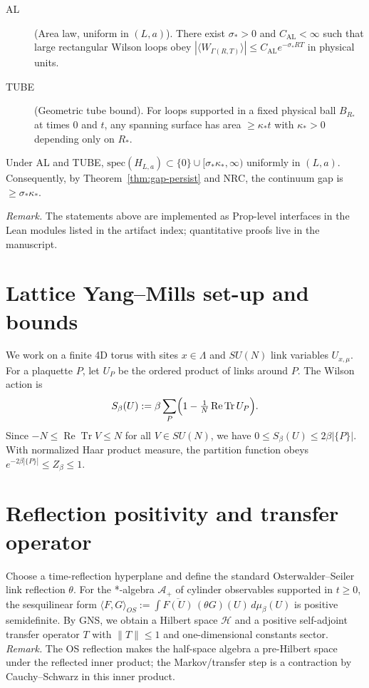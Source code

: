 \documentclass[11pt]{amsart}
\begin{document}
\begin{description}
\item[AL] (Area law, uniform in $(L,a)$). There exist $\sigma_*>0$ and $C_{\mathrm{AL}}<\infty$ such that large rectangular Wilson loops obey $|\langle W_{\Gamma(R,T)}\rangle|\le C_{\mathrm{AL}} e^{-\sigma_* RT}$ in physical units.
\item[TUBE] (Geometric tube bound). For loops supported in a fixed physical ball $B_{R_*}$ at times $0$ and $t$, any spanning surface has area $\ge \kappa_* t$ with $\kappa_*>0$ depending only on $R_*$. 
\end{description}

\begin{theorem}\label{thm:AL-gap}
Under AL and TUBE, $\mathrm{spec}(H_{L,a})\subset\{0\}\cup[\sigma_*\kappa_*,\infty)$ uniformly in $(L,a)$. Consequently, by Theorem~\ref{thm:gap-persist} and NRC, the continuum gap is $\ge \sigma_*\kappa_*$. 
\end{theorem}

\noindent\emph{Remark.} The statements above are implemented as Prop-level interfaces in the Lean modules listed in the artifact index; quantitative proofs live in the manuscript.

\section{Lattice Yang--Mills set-up and bounds}
\label{sec:lattice-setup}

We work on a finite 4D torus with sites $x\in\Lambda$ and $SU(N)$ link variables $U_{x,\mu}$. For a plaquette $P$, let $U_P$ be the ordered product of links around $P$. The Wilson action is
\[
 S_{\beta}(U) := \beta \sum_{P} \Bigl(1 - \tfrac{1}{N} \operatorname{Re} \operatorname{Tr} U_P\Bigr).
\]
Since $-N\le \operatorname{Re} \operatorname{Tr} V \le N$ for all $V\in SU(N)$, we have $0\le S_{\beta}(U)\le 2\beta |\{P\}|$. With normalized Haar product measure, the partition function obeys $e^{-2\beta |\{P\}|}\le Z_{\beta}\le 1$.

\section{Reflection positivity and transfer operator}

Choose a time-reflection hyperplane and define the standard Osterwalder--Seiler link reflection $\theta$. For the *-algebra $\mathcal A_+$ of cylinder observables supported in $t\ge 0$, the sesquilinear form $\langle F,G\rangle_{OS}:=\int \overline{F(U)}\,(\theta G)(U)\, d\mu_{\beta}(U)$ is positive semidefinite. By GNS, we obtain a Hilbert space $\mathcal H$ and a positive self-adjoint transfer operator $T$ with $\lVert T\rVert\le 1$ and one-dimensional constants sector.
\smallskip
\noindent\emph{Remark.} The OS reflection makes the half-space algebra a pre-Hilbert space under the reflected inner product; the Markov/transfer step is a contraction by Cauchy–Schwarz in this inner product.
\end{document}
